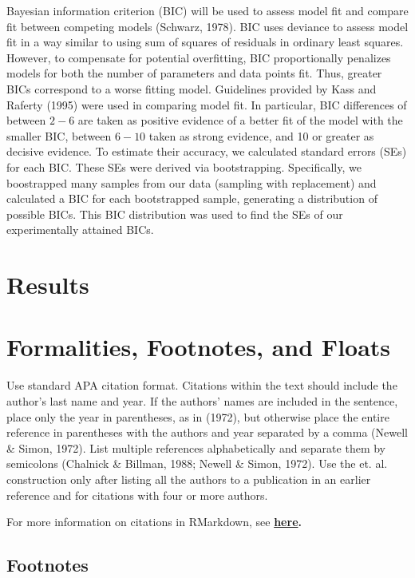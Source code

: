 \documentclass[10pt, letterpaper]{article}
\begin{document}
Bayesian information criterion (BIC) will be used to assess model fit
and compare fit between competing models (Schwarz, 1978). BIC uses
deviance to assess model fit in a way similar to using sum of squares of
residuals in ordinary least squares. However, to compensate for
potential overfitting, BIC proportionally penalizes models for both the
number of parameters and data points fit. Thus, greater BICs correspond
to a worse fitting model. Guidelines provided by Kass and Raferty (1995)
were used in comparing model fit. In particular, BIC differences of
between \(2 - 6\) are taken as positive evidence of a better fit of the
model with the smaller BIC, between \(6 - 10\) taken as strong evidence,
and 10 or greater as decisive evidence. To estimate their accuracy, we
calculated standard errors (SEs) for each BIC. These SEs were derived
via bootstrapping. Specifically, we boostrapped many samples from our
data (sampling with replacement) and calculated a BIC for each
bootstrapped sample, generating a distribution of possible BICs. This
BIC distribution was used to find the SEs of our experimentally attained
BICs.

\section{Results}\label{results}

\section{Formalities, Footnotes, and
Floats}\label{formalities-footnotes-and-floats}

Use standard APA citation format. Citations within the text should
include the author's last name and year. If the authors' names are
included in the sentence, place only the year in parentheses, as in
(1972), but otherwise place the entire reference in parentheses with the
authors and year separated by a comma (Newell \& Simon, 1972). List
multiple references alphabetically and separate them by semicolons
(Chalnick \& Billman, 1988; Newell \& Simon, 1972). Use the et. al.
construction only after listing all the authors to a publication in an
earlier reference and for citations with four or more authors.

For more information on citations in RMarkdown, see
\textbf{\href{http://rmarkdown.rstudio.com/authoring_bibliographies_and_citations.html\#citations}{here}.}

\subsection{Footnotes}\label{footnotes}
\end{document}
